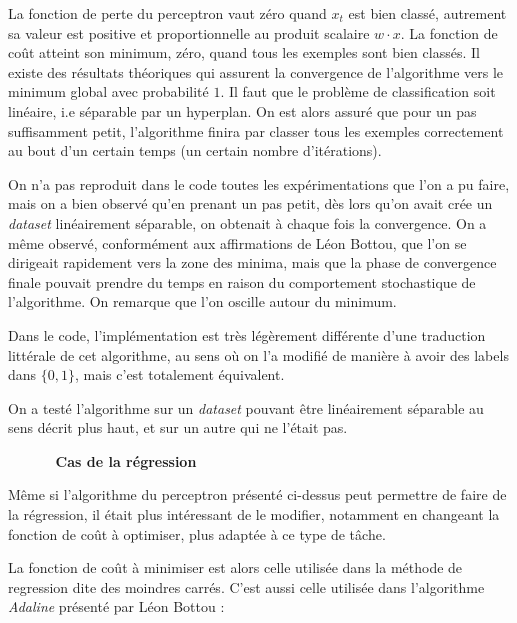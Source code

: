 \documentclass{article}
\begin{document}
La fonction de perte du perceptron vaut zéro quand $x_t$ est bien classé, autrement sa valeur est positive et proportionnelle au produit scalaire $w \cdot x$. La fonction de coût atteint son minimum, zéro, quand tous les exemples sont bien classés. Il existe des résultats théoriques qui assurent la convergence de l'algorithme vers le minimum global avec probabilité $1$. Il faut que le problème de classification soit linéaire, i.e séparable par un hyperplan. On est alors assuré que pour un pas suffisamment petit, l'algorithme finira par classer tous les exemples correctement au bout d'un certain temps (un certain nombre d'itérations).

On n'a pas reproduit dans le code toutes les expérimentations que l'on a pu faire, mais on a bien observé qu'en prenant un pas petit, dès lors qu'on avait crée un \emph{dataset} linéairement séparable, on obtenait à chaque fois la convergence. On a même observé, conformément aux affirmations de Léon Bottou, que l'on se dirigeait rapidement vers la zone des minima, mais que la phase de convergence finale pouvait prendre du temps en raison du comportement stochastique de l'algorithme. On remarque que l'on oscille autour du minimum. 
\bigskip

Dans le code, l'implémentation est très légèrement différente d'une traduction littérale de cet algorithme, au sens où on l'a modifié de manière à avoir des labels dans $\{0, 1\}$, mais c'est totalement équivalent.  

On a testé l'algorithme sur un \emph{dataset} pouvant être linéairement séparable au sens décrit plus haut, et sur un autre qui ne l'était pas. 
\bigskip

\begin{itemize}
\item []
    \begin{itemize}
        \item [\textbf{Cas de la régression}]
    \end{itemize}
\end{itemize}
\bigskip


Même si l'algorithme du perceptron présenté ci-dessus peut permettre de faire de la régression, il était plus intéressant de le modifier, notamment en changeant la fonction de coût à optimiser, plus adaptée à ce type de tâche.
\bigskip

La fonction de coût à minimiser est alors celle utilisée dans la méthode de regression dite des moindres carrés. C'est aussi celle utilisée dans l'algorithme \emph{Adaline} présenté par Léon Bottou :
\end{document}
